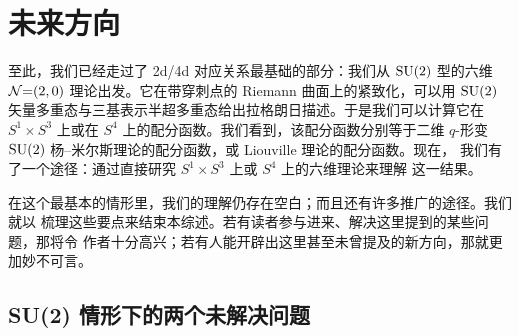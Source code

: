 
\section{未来方向}

至此，我们已经走过了 2d/4d 对应关系最基础的部分：我们从 $\mathrm{SU}(2)$ 型的六维
$\mathcal{N}{=}(2,0)$ 理论出发。它在带穿刺点的 Riemann 曲面上的紧致化，可以用 $\mathrm{SU}(2)$
矢量多重态与三基表示半超多重态给出拉格朗日描述。于是我们可以计算它在
$S^1\times S^3$ 上或在 $S^4$ 上的配分函数。我们看到，该配分函数分别等于二维
$q$-形变 $\mathrm{SU}(2)$ 杨--米尔斯理论的配分函数，或 Liouville 理论的配分函数。现在，
我们有了一个途径：通过直接研究 $S^1\times S^3$ 上或 $S^4$ 上的六维理论来理解
这一结果。

在这个最基本的情形里，我们的理解仍存在空白；而且还有许多推广的途径。我们就以
梳理这些要点来结束本综述。若有读者参与进来、解决这里提到的某些问题，那将令
作者十分高兴；若有人能开辟出这里甚至未曾提及的新方向，那就更加妙不可言。


\subsection{SU(2) 情形下的两个未解决问题}

